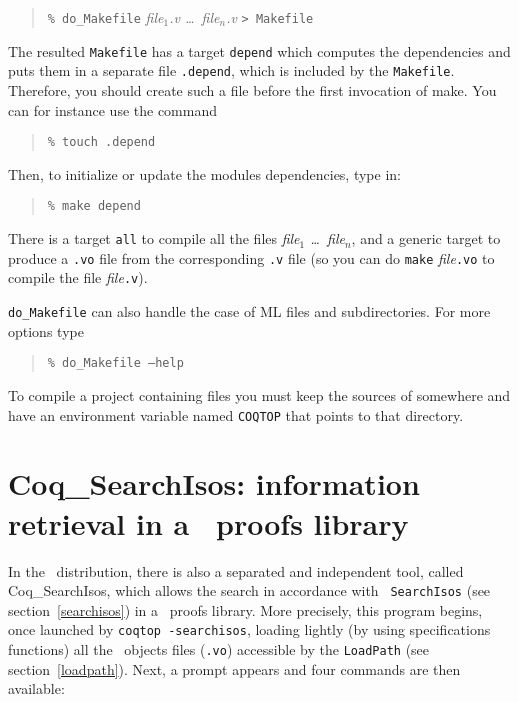 \begin{quotation}
\texttt{\% do\_Makefile} {\em file$_1$.v \dots\ file$_n$.v} \texttt{> Makefile}
\end{quotation}

The resulted {\tt Makefile} has a target {\tt depend} which computes the
dependencies and puts them in a separate file {\tt .depend}, which is
included by the {\tt Makefile}. 
Therefore, you should create such a file before the first invocation
of make. You can for instance use the command 

\begin{quotation}
\texttt{\% touch .depend}
\end{quotation}

Then, to initialize or update the modules dependencies, type in:

\begin{quotation}
\texttt{\% make depend}
\end{quotation}

There is a target {\tt all} to compile all the files {\em file$_1$
\dots\ file$_n$}, and a generic target to produce a {\tt .vo} file from
the corresponding {\tt .v} file (so you can do {\tt make} {\em file}{\tt.vo}
to compile the file {\em file}{\tt.v}).

{\tt do\_Makefile} can also handle the case of ML files and
subdirectories. For more options type

\begin{quotation}
\texttt{\% do\_Makefile --help}
\end{quotation}

\Warning To compile a project containing \ocaml{} files you must keep
the sources of \Coq{} somewhere and have an environment variable named
\texttt{COQTOP} that points to that directory.

\section{{\sf Coq\_SearchIsos}: information retrieval in a \Coq\ proofs
library}
\label{coqsearchisos}

In the \Coq\ distribution, there is also a separated and independent tool,
called {\sf Coq\_SearchIsos}, which allows the search in accordance with {\tt
SearchIsos} (see section~\ref{searchisos})
in a \Coq\ proofs library. More precisely, this program begins, once launched
by {\tt coqtop -searchisos}, loading lightly (by using specifications functions)
all the \Coq\ objects files ({\tt .vo}) accessible by the {\tt LoadPath} (see
section~\ref{loadpath}). Next, a prompt appears and four commands are then
available:

